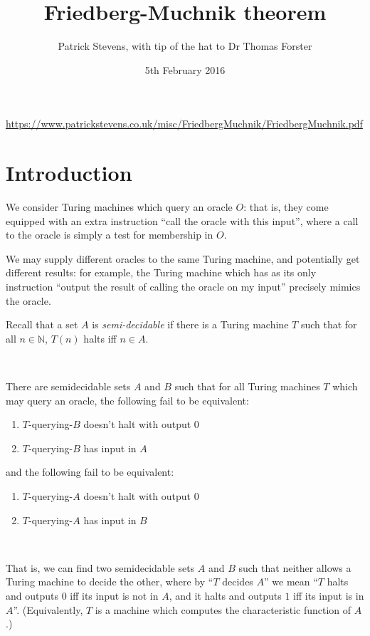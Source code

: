 \documentclass[11pt]{amsart}
\title{Friedberg-Muchnik theorem}
\author{Patrick Stevens, with tip of the hat to Dr Thomas Forster}
\date{5th February 2016}
\begin{document}
\maketitle

\tiny \begin{center} \url{https://www.patrickstevens.co.uk/misc/FriedbergMuchnik/FriedbergMuchnik.pdf} \end{center}

\normalsize

\section{Introduction}

We consider Turing machines which query an oracle $O$: that is, they come equipped with an extra instruction ``call the oracle with this input'', where a call to the oracle is simply a test for membership in $O$.

We may supply different oracles to the same Turing machine, and potentially get different results: for example, the Turing machine which has as its only instruction ``output the result of calling the oracle on my input'' precisely mimics the oracle.

Recall that a set $A$ is \emph{semi-decidable} if there is a Turing machine $T$ such that for all $n \in \mathbb{N}$, $T(n)$ halts iff $n \in A$.

\

\begin{thm} There are semidecidable sets $A$ and $B$ such that for all Turing machines $T$ which may query an oracle, the following fail to be equivalent:

\begin{enumerate}
\item $T$-querying-$B$ doesn't halt with output $0$
\item $T$-querying-$B$ has input in $A$
\end{enumerate}

and the following fail to be equivalent:
\begin{enumerate}
\item $T$-querying-$A$ doesn't halt with output $0$
\item $T$-querying-$A$ has input in $B$
\end{enumerate}
\end{thm}

\

That is, we can find two semidecidable sets $A$ and $B$ such that neither allows a Turing machine to decide the other, where by ``$T$ decides $A$'' we mean ``$T$ halts and outputs $0$ iff its input is not in $A$, and it halts and outputs $1$ iff its input is in $A$''.
(Equivalently, $T$ is a machine which computes the characteristic function of $A$.)
\end{document}
